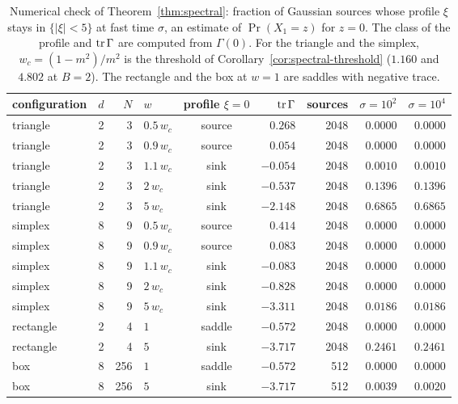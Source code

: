 \documentclass{article} %
\theoremstyle{plain}
\theoremstyle{definition}
\theoremstyle{remark}
\begin{document}
\begin{table}[htb]
\centering\small
\begin{tabular}{@{}lrrlcrrrr@{}}
\toprule
configuration & $d$ & $N$ & $w$ & profile $\xi=0$ & $\operatorname{tr}\Gamma$ & sources & $\sigma=10^2$ & $\sigma=10^4$\\
\midrule
triangle & 2 & 3 & $0.5\,w_c$ & source & $0.268$ & 2048 & $0.0000$ & $0.0000$\\
triangle & 2 & 3 & $0.9\,w_c$ & source & $0.054$ & 2048 & $0.0000$ & $0.0000$\\
triangle & 2 & 3 & $1.1\,w_c$ & sink & $-0.054$ & 2048 & $0.0010$ & $0.0010$\\
triangle & 2 & 3 & $2\,w_c$ & sink & $-0.537$ & 2048 & $0.1396$ & $0.1396$\\
triangle & 2 & 3 & $5\,w_c$ & sink & $-2.148$ & 2048 & $0.6865$ & $0.6865$\\
simplex & 8 & 9 & $0.5\,w_c$ & source & $0.414$ & 2048 & $0.0000$ & $0.0000$\\
simplex & 8 & 9 & $0.9\,w_c$ & source & $0.083$ & 2048 & $0.0000$ & $0.0000$\\
simplex & 8 & 9 & $1.1\,w_c$ & sink & $-0.083$ & 2048 & $0.0000$ & $0.0000$\\
simplex & 8 & 9 & $2\,w_c$ & sink & $-0.828$ & 2048 & $0.0000$ & $0.0000$\\
simplex & 8 & 9 & $5\,w_c$ & sink & $-3.311$ & 2048 & $0.0186$ & $0.0186$\\
rectangle & 2 & 4 & $1$ & saddle & $-0.572$ & 2048 & $0.0000$ & $0.0000$\\
rectangle & 2 & 4 & $5$ & sink & $-3.717$ & 2048 & $0.2461$ & $0.2461$\\
box & 8 & 256 & $1$ & saddle & $-0.572$ & 512 & $0.0000$ & $0.0000$\\
box & 8 & 256 & $5$ & sink & $-3.717$ & 512 & $0.0039$ & $0.0020$\\
\bottomrule
\end{tabular}
\caption{Numerical check of Theorem~\ref{thm:spectral}: fraction of Gaussian sources whose
profile $\xi$ stays in $\{|\xi|<5\}$ at fast time $\sigma$, an estimate of $\Pr(X_1=z)$ for $z=0$.
The class of the profile and $\operatorname{tr}\Gamma$ are computed from $\Gamma(0)$. For the triangle and the
simplex, $w_c=(1-m^2)/m^2$ is the threshold of Corollary~\ref{cor:spectral-threshold}
($1.160$ and $4.802$ at $B=2$). The rectangle and the box at $w=1$ are saddles with negative
trace.}
\label{tab:spectral}
\end{table}
\end{document}
